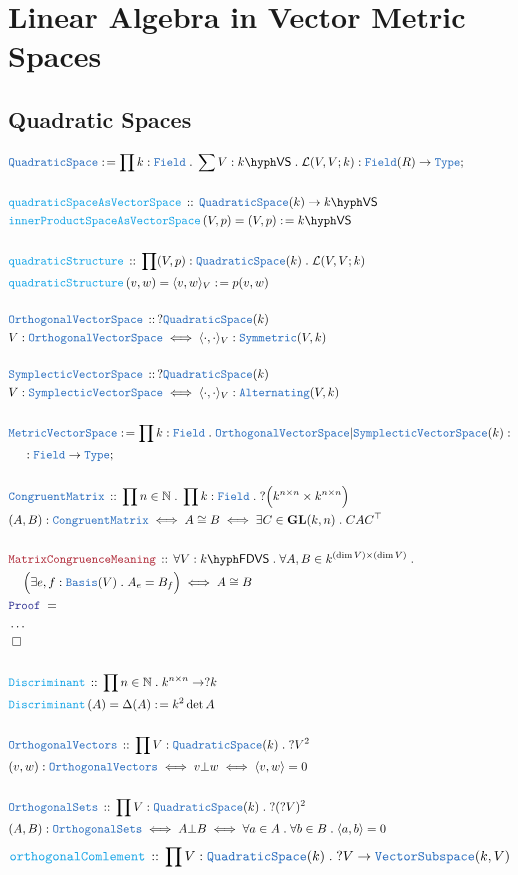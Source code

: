 \documentclass[12pt]{scrartcl}%
\newcommand{\TYPE}[1]{\textcolor{NavyBlue}{\mathtt{#1}}}%
\newcommand{\FUNC}[1]{\textcolor{Cerulean}{\mathtt{#1}}}%
\newcommand{\LOGIC}[1]{\textcolor{Blue}{\mathtt{#1}}}%
\newcommand{\THM}[1]{\textcolor{Maroon}{\mathtt{#1}}}%
\renewcommand{\.}{\; . \;} %
\newcommand{\de}{: \kern 0.1pc =} %
\newcommand{\Act}[1]{\left( #1 \right)} %
\newcommand{\Theorem}[2]{& \THM{#1} \, :: \, #2 \\ & \Proof = \\ } %
\newcommand{\DeclareType}[2]{& \TYPE{#1} \, :: \, #2 \\}%
\newcommand{\DefineType}[3]{& #1 : \TYPE{#2} \iff #3 \\}%
\newcommand{\DefineNamedType}[4]{& #1 : \TYPE{#2} \iff #3 \iff #4 \\}%
\newcommand{\DeclareFunc}[2]{& \FUNC{#1} \, :: \, #2 \\}%
\newcommand{\DefineNamedFunc}[4]{&  \FUNC{#1}\Act{#2} = #3 \de #4 \\}%
\newcommand{\NewLine}{\\ & \kern 1pc}%
\newcommand{\Page}[1]{ \begin{align*} #1 \end{align*}  }%
\newcommand{\NoProof}{ & \ldots \\ \EndProof}%
\newcommand{\Type}{\TYPE{Type}}%
\newcommand{\Nat}{\mathbb{N}}%
\newcommand{\Conclude}[3]{& #1 \de #2 : #3; \\}%
\newcommand{\QED}{\; \square} %
\newcommand{\EndProof}{& \QED \\} %
\newcommand{\Proof}{\LOGIC{Proof} \; } %
\newcommand{\Basis}{\TYPE{Basis}} %
\newcommand{\GL}{\mathbf{GL}}%
\newcommand{\OVS}{\TYPE{OrthogonalVectorSpace}}
\newcommand{\SVS}{\TYPE{SymplecticVectorSpace}}
\newcommand{\MVS}{\TYPE{MetricVectorSpace}}
\newcommand{\VS}[1]{#1\hyph\mathsf{VS}} %
\newcommand{\FDVS}[1]{#1\hyph\mathsf{FDVS}} %
\renewcommand{\L}{\mathcal{L}}
\begin{document}
\section{Linear Algebra in Vector Metric Spaces}
\subsection{Quadratic Spaces}
\Page{
	\Conclude{\TYPE{QuadraticSpace}}{\prod k : \TYPE{Field} \. \sum V : \VS{k} \. \L(V,V;k)}{ 
		\TYPE{Field}(R) \to \Type}
	\\
	\DeclareFunc{quadraticSpaceAsVectorSpace}{ \TYPE{QuadraticSpace}(k) \to \VS{k}}
	\DefineNamedFunc{innerProductSpaceAsVectorSpace}{V,p}{(V,p)}{\VS{k}} 
	\\
	\DeclareFunc{quadraticStructure}{ \prod (V,p) : \TYPE{QuadraticSpace}(k) \. \L(V,V;k)}
	\DefineNamedFunc{quadraticStructure}{v,w}{\langle v, w \rangle_V}{p(v,w)}
	\\
	\DeclareType{\OVS}{?\TYPE{QuadraticSpace}(k)}
	\DefineType{V}{\OVS}{\langle \cdot,\cdot \rangle_V : \TYPE{Symmetric}(V,k)}
	\\
	\DeclareType{\SVS}{?\TYPE{QuadraticSpace}(k)}
	\DefineType{V}{\SVS}{\langle \cdot,\cdot \rangle_V : \TYPE{Alternating}(V,k)}
	\\
	\Conclude{\MVS}{\prod k : \TYPE{Field} \. \OVS | \SVS(k)}{\NewLine : \TYPE{Field} \to \Type} 
	\\
	\DeclareType{CongruentMatrix}{\prod n \in \Nat \. \prod k : \TYPE{Field} \. ?\Big(k^{n \times n} \times k^{n \times n} \Big)}
	\DefineNamedType{(A,B)}{CongruentMatrix}{ A \cong B }{ \exists C \in \GL(k,n) \. CAC^{\top}  }
	\\
	\Theorem{MatrixCongruenceMeaning}{\forall V : \FDVS{k} \. \forall A,B \in k^{(\dim V) \times (\dim V)} \. \NewLine  \Big(\exists e,f : \Basis(V) \. A_e = B_f \Big) \iff  A \cong B  }
	\NoProof
	\\
	\DeclareFunc{Discriminant}{\prod n \in \Nat \. k^{n \times n} \to ?k}
	\DefineNamedFunc{Discriminant}{A}{\Delta(A)}{ k^2 \det A}
	\\
	\DeclareType{OrthogonalVectors}{\prod V : \TYPE{QuadraticSpace}(k) \. ?V^2}
	\DefineNamedType{(v,w)}{OrthogonalVectors}{v \bot w}{\langle v, w \rangle = 0}
	\\
	\DeclareType{OrthogonalSets}{\prod V : \TYPE{QuadraticSpace}(k) \. ?(?V)^2}
	\DefineNamedType{(A,B)}{OrthogonalSets}{A \bot B}{\forall a \in A \. \forall b \in B \. \langle a, b \rangle = 0}
}\Page{
	\DeclareFunc{orthogonalComlement}{\prod V : \TYPE{QuadraticSpace}(k) \. ?V \to \TYPE{VectorSubspace}(k,V) }
}
\end{document}
